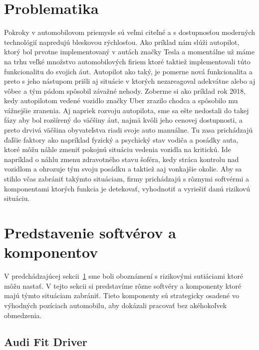 \documentclass[10pt,twoside,slovak,a4paper]{article}
\begin{document}
\section{Problematika} \label{problematika}

Pokroky v automobilovom priemysle sú veľmi citeľné a s dostupnosťou moderných technológií napredujú bleskovou rýchlosťou. Ako príklad nám slúži autopilot, ktorý bol prvotne implementovaný v autách značky Tesla a momentálne už máme na trhu veľké množstvo automobilových firiem ktoré taktiež implementovali túto funkcionalitu do svojich áut. Autopilot ako taký, je pomerne nová funkcionalita a preto s jeho nástupom prišli aj situácie v ktorých nezareagoval adekvátne alebo aj vôbec a tým pádom spôsobil závažné nehody. Zoberme si ako príklad rok 2018\cite{main}, kedy autopilotom vedené vozidlo značky Uber zrazilo chodca a spôsobilo mu vážnejšie zranenia. Aj napriek rozvoju autopilota, sme sa ešte nedostali do takej fázy aby bol rozšírený do väčšiny áut, najmä kvôli jeho cenovej dostupnosti, a preto drvivá väčšina obyvateľstva riadi svoje auto manuálne. Tu zasa prichádzajú ďaľšie faktory ako napríklad fyzický a psychický stav vodiča a posádky auta, ktoré môžu náhle zmeniť pokojnú situáciu vedenia vozidla na kritickú. Ide napríklad o náhlu zmenu zdravotného stavu šoféra, kedy stráca kontrolu nad vozidlom a ohrozuje tým svoju posádku a taktiež aaj vonkajšie okolie. Aby sa stihlo včas zabrániť takýmto situáciam, firmy prichádzajú s rôznymi softvérmi a komponentami ktorých funkcia je detekovať, vyhodnotiť a vyriešiť danú rizikovú situáciu.



\section{Predstavenie softvérov a komponentov} \label{predstavenie}

V predchádzajúcej sekcii~\ref{problematika} sme boli oboznámení s rizikovými sutiáciami ktoré môžu nastať. V tejto sekcii si predstavíme rôzne softvéry a komponenty ktoré majú týmto situáciam zabrániť. Tieto komponenty sú strategicky osadené vo výhodných pozíciach automobilu, aby dokázali pracovať bez akéhokoľvek obmedzenia.

\subsection{Audi Fit Driver\cite{main}} \label{predstavenie:audi}
\end{document}

